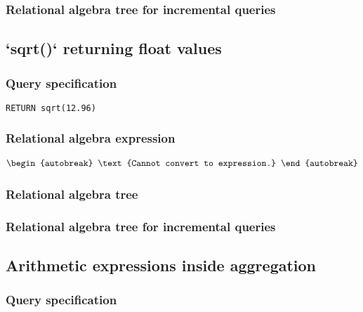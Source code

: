 \subsubsection*{Relational algebra tree for incremental queries}


\subsection{`sqrt()` returning float values}

\subsubsection*{Query specification}

\begin{lstlisting}
RETURN sqrt(12.96)
\end{lstlisting}

\subsubsection*{Relational algebra expression}

\begin{align*}
\begin{autobreak}
\text{Cannot convert to expression.}
\end{autobreak}
\end{align*}

\subsubsection*{Relational algebra tree}


\subsubsection*{Relational algebra tree for incremental queries}


\subsection{Arithmetic expressions inside aggregation}

\subsubsection*{Query specification}

